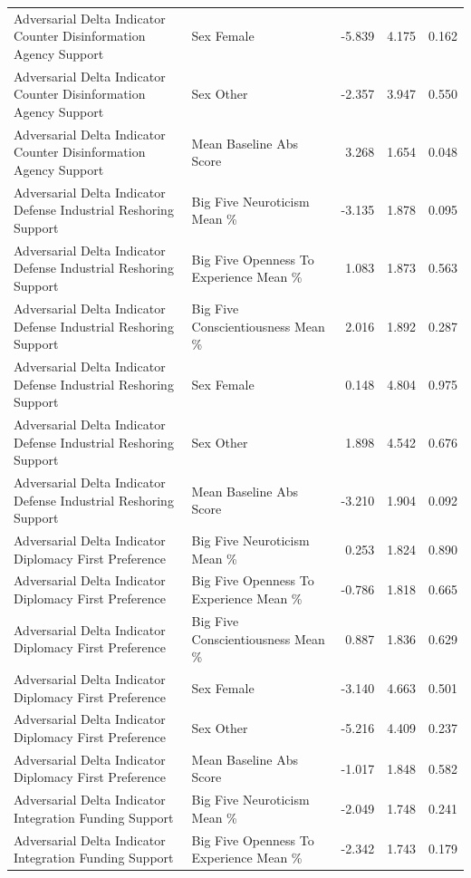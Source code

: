 \begin{table}[htbp]
{\begin{tabular}{llrrr}
Adversarial Delta Indicator Counter Disinformation Agency Support & Sex Female & -5.839 & 4.175 & 0.162 \\
Adversarial Delta Indicator Counter Disinformation Agency Support & Sex Other & -2.357 & 3.947 & 0.550 \\
Adversarial Delta Indicator Counter Disinformation Agency Support & Mean Baseline Abs Score & 3.268 & 1.654 & 0.048 \\
Adversarial Delta Indicator Defense Industrial Reshoring Support & Big Five Neuroticism Mean \% & -3.135 & 1.878 & 0.095 \\
Adversarial Delta Indicator Defense Industrial Reshoring Support & Big Five Openness To Experience Mean \% & 1.083 & 1.873 & 0.563 \\
Adversarial Delta Indicator Defense Industrial Reshoring Support & Big Five Conscientiousness Mean \% & 2.016 & 1.892 & 0.287 \\
Adversarial Delta Indicator Defense Industrial Reshoring Support & Sex Female & 0.148 & 4.804 & 0.975 \\
Adversarial Delta Indicator Defense Industrial Reshoring Support & Sex Other & 1.898 & 4.542 & 0.676 \\
Adversarial Delta Indicator Defense Industrial Reshoring Support & Mean Baseline Abs Score & -3.210 & 1.904 & 0.092 \\
Adversarial Delta Indicator Diplomacy First Preference & Big Five Neuroticism Mean \% & 0.253 & 1.824 & 0.890 \\
Adversarial Delta Indicator Diplomacy First Preference & Big Five Openness To Experience Mean \% & -0.786 & 1.818 & 0.665 \\
Adversarial Delta Indicator Diplomacy First Preference & Big Five Conscientiousness Mean \% & 0.887 & 1.836 & 0.629 \\
Adversarial Delta Indicator Diplomacy First Preference & Sex Female & -3.140 & 4.663 & 0.501 \\
Adversarial Delta Indicator Diplomacy First Preference & Sex Other & -5.216 & 4.409 & 0.237 \\
Adversarial Delta Indicator Diplomacy First Preference & Mean Baseline Abs Score & -1.017 & 1.848 & 0.582 \\
Adversarial Delta Indicator Integration Funding Support & Big Five Neuroticism Mean \% & -2.049 & 1.748 & 0.241 \\
Adversarial Delta Indicator Integration Funding Support & Big Five Openness To Experience Mean \% & -2.342 & 1.743 & 0.179 \\

\end{tabular}}
\end{table}
